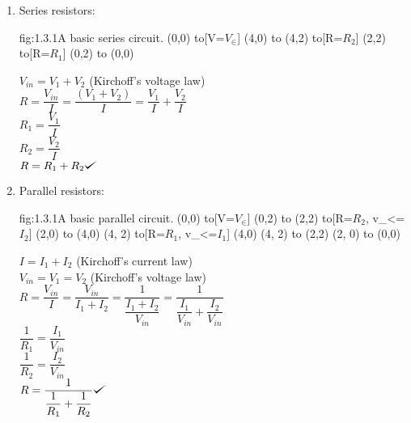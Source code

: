 \documentclass{article}
\def\checkmark{\tikz\fill[scale=0.4](0,.35) -- (.25,0) -- (1,.7) -- (.25,.15) -- cycle;}
\begin{document}
    \begin{enumerate}
        \item
        Series resistors:
        \begin{circuit}{fig:1.3.1}{A basic series circuit.}
            (0,0) to[V=$V_\in$] (4,0)
                to (4,2)
                to[R=$R_2$] (2,2)
                to[R=$R_1$] (0,2)
                to (0,0)
        \end{circuit}

        $V_{in} = V_{1} + V_{2}$ (Kirchoff's voltage law)\\

        $R = \dfrac{V_{in}}{I} = \dfrac{(V_{1} + V_{2})}{I} = \dfrac{V_{1}}{I} + \dfrac{V_{2}}{I}$ \\

        $R_{1} = \dfrac{V_{1}}{I}$ \\

        $R_{2} = \dfrac{V_{2}}{I}$ \\

        $R = R_{1} + R_{2}  \checkmark $ \\

        \item
        Parallel resistors:
        \begin{circuit}{fig:1.3.1}{A basic parallel circuit.}
            (0,0) to[V=$V_\in$] (0,2)
                to (2,2)
                to[R=$R_2$,  v_<=$I_{2}$] (2,0)
                to (4,0)
                (4, 2) to[R=$R_1$,  v_<=$I_{1}$] (4,0)
                (4, 2) to (2,2)
                (2, 0) to (0,0)
        \end{circuit}

        $I = I_{1} + I_{2}$ (Kirchoff's current law)\\

        $V_{in} = V_{1} =  V_{2}$ (Kirchoff's voltage law)\\

        $R = \dfrac{V_{in}}{I} = \dfrac{V_{in}}{I_{1} + I_{2}} = \dfrac{1}{\dfrac{I_{1} + I_{2}}{V_{in}}} = \dfrac{1}{\dfrac{I_{1}}{V_{in}} + \dfrac{I_{2}}{V_{in}}}$  \\

        $\dfrac{1}{R_{1}} = \dfrac{I_{1}}{V_{in}}$ \\

        $\dfrac{1}{R_{2}} = \dfrac{I_{2}}{V_{in}}$ \\

        $R = \dfrac{1}{\dfrac{1}{R_{1}} + \dfrac{1}{R_{2}}} \checkmark $ \\

    \end{enumerate}
\end{document}
